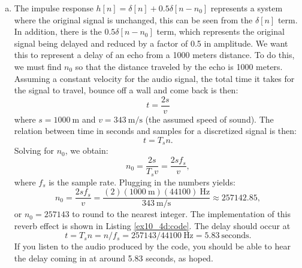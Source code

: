 \begin{enumerate}
\begin{enumerate}[a)]
          \item The impulse response $h[n] = \delta[n] + 0.5\delta[n - n_0]$ represents a system
                where the original signal is unchanged, this can be seen from the $\delta[n]$ term. In addition,
                there is the $0.5\delta[n - n_0]$ term, which represents the original signal being delayed
                and reduced by a factor of 0.5 in amplitude. We want this to represent a delay of an echo
                from a 1000 meters distance. To do this, we must find $n_0$ so that the distance traveled by
                the echo is 1000 meters. Assuming a constant velocity for the audio signal, the total time it takes
                for the signal to travel, bounce off a wall and come back is then:
                \[ t = \frac{2s}{v} \]
                where $s = 1000\ \text{m}$ and $v = 343\ \text{m/s}$ (the assumed speed of sound).
                The relation between time in seconds and samples for a discretized signal is then:
                \[ t = T_{s}n. \]
                Solving for $n_{0}$, we obtain:
                \[ n_{0} = \frac{2s}{T_{s}v} = \frac{2sf_{s}}{v}, \]
                where $f_{s}$ is the sample rate. Plugging in the numbers yields:
                \[ n_{0} = \frac{2sf_s}{v}=\frac{(2)(1000\ \text{m})(44100)\ \text{Hz}}{343\ \text{m/s}}\approx257142.85, \]
                or $n_{0} = 257143$ to round to the nearest integer. 
                The implementation of this reverb effect is shown in Listing \ref*{ex10_4d:code}. 
                The delay should occur at 
                \[ t = T_{s}n = n/f_{s} = 257143/44100\ \text{Hz} = 5.83\ \text{seconds}.\]
                If you listen to the audio produced by the code, you should be able to hear the delay coming in at
                around 5.83 seconds, as hoped.
                
                

        \end{enumerate}

\end{enumerate}